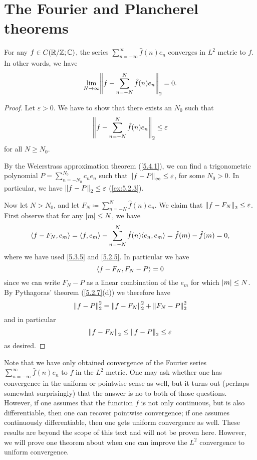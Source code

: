\section{The Fourier and Plancherel theorems}\label{sec:5.5}

\begin{thm}\label{5.5.1}
  For any \(f \in C(\R / \Z ; \C)\), the series \(\sum_{n = -\infty}^\infty \hat{f}(n) e_n\) converges in \(L^2\) metric to \(f\).
  In other words, we have
  \[
    \lim_{N \to \infty} \norm*{f - \sum_{n = -N}^N \hat{f}(n) e_n}_2 = 0.
  \]
\end{thm}

\begin{proof}
  Let \(\varepsilon > 0\).
  We have to show that there exists an \(N_0\) such that
  \[
    \norm*{f - \sum_{n = -N}^N \hat{f}(n) e_n}_2 \leq \varepsilon
  \]
  for all \(N \geq N_0\).

  By the Weierstrass approximation theorem (\cref{5.4.1}), we can find a trigonometric polynomial \(P = \sum_{n = -N_0}^{N_0} c_n e_n\) such that \(\norm*{f - P}_{\infty} \leq \varepsilon\), for some \(N_0 > 0\).
  In particular, we have \(\norm*{f - P}_2 \leq \varepsilon\) (\cref{ex:5.2.3}).

  Now let \(N > N_0\), and let \(F_N \coloneqq \sum_{n = -N}^N \hat{f}(n) e_n\).
  We claim that \(\norm*{f - F_N}_2 \leq \varepsilon\).
  First observe that for any \(\abs{m} \leq N\), we have
  \[
    \inner*{f - F_N, e_m} = \inner*{f, e_m} - \sum_{n = -N}^N \hat{f}(n) \inner*{e_n, e_m} = \hat{f}(m) - \hat{f}(m) = 0,
  \]
  where we have used \cref{5.3.5} and \cref{5.2.5}.
  In particular we have
  \[
    \inner*{f - F_N, F_N - P} = 0
  \]
  since we can write \(F_N - P\) as a linear combination of the \(e_m\) for which \(\abs{m} \leq N\).
  By Pythagoras' theorem (\cref{5.2.7}(d)) we therefore have
  \[
    \norm*{f - P}_2^2 = \norm*{f - F_N}_2^2 + \norm*{F_N - P}_2^2
  \]
  and in particular
  \[
    \norm*{f - F_N}_2 \leq \norm*{f - P}_2 \leq \varepsilon
  \]
  as desired.
\end{proof}

\begin{rmk}\label{5.5.2}
  Note that we have only obtained convergence of the Fourier series \(\sum_{n = -\infty}^\infty \hat{f}(n) e_n\) to \(f\) in the \(L^2\) metric.
  One may ask whether one has convergence in the uniform or pointwise sense as well, but it turns out (perhaps somewhat surprisingly) that the answer is no to both of those questions.
  However, if one assumes that the function \(f\) is not only continuous, but is also differentiable, then one can recover pointwise convergence;
  if one assumes continuously differentiable, then one gets uniform convergence as well.
  These results are beyond the scope of this text and will not be proven here.
  However, we will prove one theorem about when one can improve the \(L^2\) convergence to uniform convergence.
\end{rmk}

